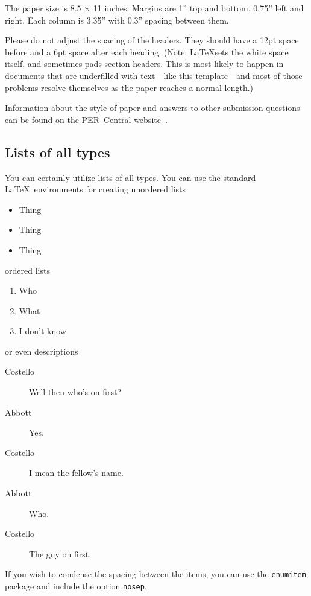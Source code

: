 \documentclass[english,aps,prstper,reprint,showpacs,titlepage,longbibliography]{revtex4-2}
\begin{document}
The paper size is 8.5 $\times$ 11 inches.  Margins are 1'' top and bottom, 0.75'' left and
right.  Each column is 3.35'' with 0.3'' spacing between them.

Please do not adjust the spacing of the headers.  They should have a 12pt space before and a
6pt space after each heading. (Note: \LaTeX sets the white space itself, and sometimes pads
section headers. This is most likely to happen in documents that are underfilled with
text---like this template---and most of those problems resolve themselves as the paper reaches
a normal length.)

Information about the style of paper and answers to other submission questions can be found on
the PER--Central website~\cite{per-cent}. %


\subsection{Lists of all types}
You can certainly utilize lists of all types.  You can use the standard \LaTeX\ environments
for creating unordered lists
\begin{itemize}
  \item Thing
  \item Thing
  \item Thing
\end{itemize}
ordered lists
\begin{enumerate}
  \item Who
  \item What
  \item I don't know
\end{enumerate}
or even descriptions
\begin{description}
  \item[Costello] Well then who's on first?
  \item[Abbott] Yes.
  \item[Costello] I mean the fellow's name.
  \item[Abbott] Who.
  \item[Costello] The guy on first.
\end{description}

If you wish to condense the spacing between the items, you can use the \texttt{enumitem}
package and include the option \texttt{nosep}.
\end{document}
